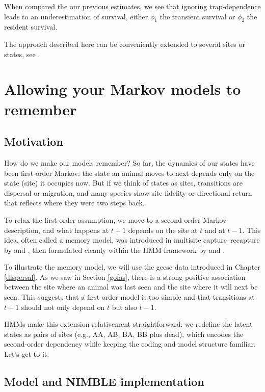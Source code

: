 \documentclass[
  12pt,
]{krantz}
\begin{document}
When compared the our previous estimates, we see that ignoring trap-dependence leads to an underestimation of survival, either \(\phi_1\) the transient survival or \(\phi_{2}\) the resident survival.

The approach described here can be conveniently extended to several sites or states, see \citet{pradeltrapdep2012}.

\section{Allowing your Markov models to remember}\label{memorymodel}

\subsection{Motivation}\label{motivation-4}

How do we make our models remember? So far, the dynamics of our states have been first-order Markov: the state an animal moves to next depends only on the state (site) it occupies now. But if we think of states as sites, transitions are dispersal or migration, and many species show site fidelity or directional return that reflects where they were two steps back.

To relax the first-order assumption, we move to a second-order Markov description, and what happens at \(t+1\) depends on the site at \(t\) and at \(t−1\). This idea, often called a memory model, was introduced in multisite capture--recapture by \citet{hestbeck1991estimates} and \citet{BrownieEtAl1993}, then formulated cleanly within the HMM framework by \citet{rouan2009memory} and \citet{pradel_multievent_2005}.

To illustrate the memory model, we will use the geese data introduced in Chapter \ref{dispersal}. As we saw in Section \ref{gofas}, there is a strong positive association between the site where an animal was last seen and the site where it will next be seen. This suggests that a first-order model is too simple and that transitions at \(t+1\) should not only depend on \(t\) but also \(t-1\).

HMMs make this extension relativement straightforward: we redefine the latent states as pairs of sites (e.g., AA, AB, BA, BB plus dead), which encodes the second-order dependency while keeping the coding and model structure familiar. Let's get to it.

\subsection{Model and NIMBLE implementation}\label{model-and-nimble-implementation-4}
\end{document}
